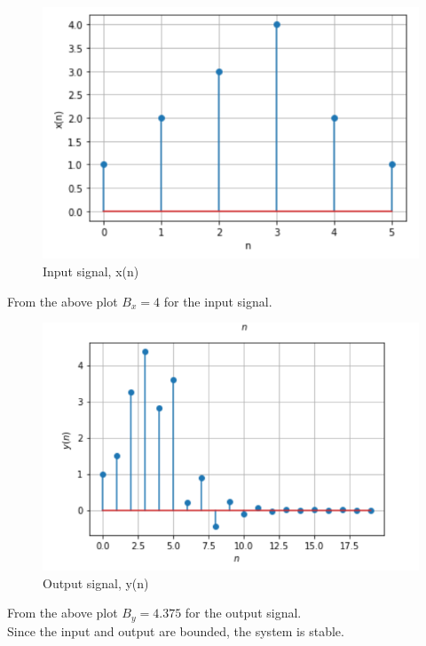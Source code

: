 \documentclass[journal,12pt,twocolumn]{IEEEtran}
\begin{document}
\begin{figure}[h!]
    \centering
    \includegraphics[scale=0.42]{input.png}
    \caption{Input signal, x(n)}\label{fig:df1a}
\end{figure}
From the above plot $B_x=4$ for the input signal. \medskip

\begin{figure}[h!]
    \centering
    \includegraphics[scale=0.42]{output.png}
    \caption{Output signal, y(n)}
\end{figure}
From the above plot $B_y=4.375$ for the output signal.\medskip\\ Since the input and output are bounded, the system is stable.
\end{document}
